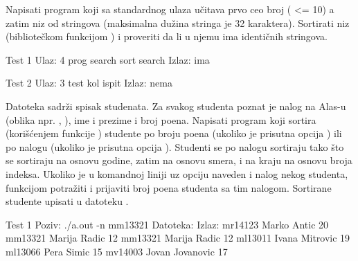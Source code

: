 \begin{Exercise}[label=514]
  Napisati program koji sa standardnog ulaza učitava prvo ceo broj
   ( <= 10) a zatim niz  od  stringova
  (maksimalna dužina stringa je 32 karaktera). Sortirati niz 
  (bibliotečkom funkcijom ) i proveriti da li u njemu ima
  identičnih stringova.
  
\begin{miditest}
\begin{test}{Test 1}
Ulaz:   4 prog search sort search
Izlaz:  ima
\end{test}
\end{miditest}
\begin{miditest}
\begin{test}{Test 2}
Ulaz:   3 test kol ispit
Izlaz:  nema
\end{test}
\end{miditest}
  
\end{Exercise}

\begin{Exercise}[label=515]
  Datoteka  sadrži spisak studenata. Za svakog
  studenta poznat je nalog na Alas-u (oblika npr. ,
  ), ime i prezime i broj poena. Napisati program koji
  sortira (korišćenjem funkcije ) studente po broju poena
  (ukoliko je prisutna opcija ) ili po nalogu (ukoliko je
  prisutna opcija ). Studenti se po nalogu sortiraju tako što
  se sortiraju na osnovu godine, zatim na osnovu smera, i na kraju na
  osnovu broja indeksa. Ukoliko je u komandnoj liniji uz opciju
   naveden i nalog nekog studenta, funkcijom 
  potražiti i prijaviti broj poena studenta sa tim nalogom. Sortirane
  studente upisati u datoteku .
  
\begin{maxitest}
\begin{test}{Test 1}
Poziv: ./a.out -n mm13321
Datoteka:                         Izlaz:
mr14123 Marko Antic 20            mm13321 Marija Radic 12
mm13321 Marija Radic 12
ml13011 Ivana Mitrovic 19
ml13066 Pera Simic 15
mv14003 Jovan Jovanovic 17
\end{test}
\end{maxitest}
  
\end{Exercise}

